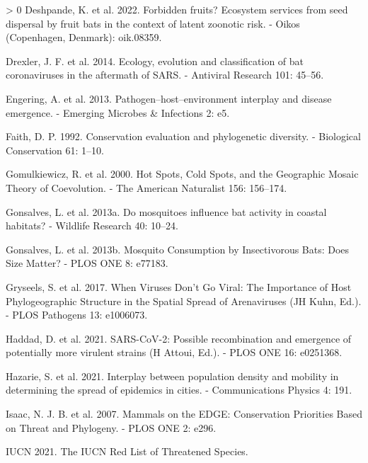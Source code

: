 \documentclass[11pt]{article}
\newlength{\cslhangindent}
\newenvironment{CSLReferences}[3] %
 {%
  \setlength{\parindent}{0pt}
  \ifodd #1 \everypar{\setlength{\hangindent}{\cslhangindent}}\ignorespaces\fi
  \ifnum #2 > 0
  \setlength{\parskip}{#2\baselineskip}
  \fi
 }%
 {}
\begin{document}
\begin{CSLReferences}{1}{0}
\leavevmode\hypertarget{ref-Deshpande2022ForFru}{}%
Deshpande, K. et al. 2022. Forbidden fruits? Ecosystem services from
seed dispersal by fruit bats in the context of latent zoonotic risk. -
Oikos (Copenhagen, Denmark): oik.08359.

\leavevmode\hypertarget{ref-Drexler2014EcoEvo}{}%
Drexler, J. F. et al. 2014. Ecology, evolution and classification of bat
coronaviruses in the aftermath of SARS. - Antiviral Research 101:
45--56.

\leavevmode\hypertarget{ref-Engering2013PatHos}{}%
Engering, A. et al. 2013. Pathogen--host--environment interplay and
disease emergence. - Emerging Microbes \& Infections 2: e5.

\leavevmode\hypertarget{ref-Faith1992ConEva}{}%
Faith, D. P. 1992. Conservation evaluation and phylogenetic diversity. -
Biological Conservation 61: 1--10.

\leavevmode\hypertarget{ref-Gomulkiewicz2000HotSpo}{}%
Gomulkiewicz, R. et al. 2000. Hot Spots, Cold Spots, and the Geographic
Mosaic Theory of Coevolution. - The American Naturalist 156: 156--174.

\leavevmode\hypertarget{ref-Gonsalves2013MosInf}{}%
Gonsalves, L. et al. 2013a. Do mosquitoes influence bat activity in
coastal habitats? - Wildlife Research 40: 10--24.

\leavevmode\hypertarget{ref-Gonsalves2013MosCon}{}%
Gonsalves, L. et al. 2013b. Mosquito Consumption by Insectivorous Bats:
Does Size Matter? - PLOS ONE 8: e77183.

\leavevmode\hypertarget{ref-Gryseels2017WheVir}{}%
Gryseels, S. et al. 2017. When Viruses Don't Go Viral: The Importance of
Host Phylogeographic Structure in the Spatial Spread of Arenaviruses (JH
Kuhn, Ed.). - PLOS Pathogens 13: e1006073.

\leavevmode\hypertarget{ref-Haddad2021SarPos}{}%
Haddad, D. et al. 2021. SARS-CoV-2: Possible recombination and emergence
of potentially more virulent strains (H Attoui, Ed.). - PLOS ONE 16:
e0251368.

\leavevmode\hypertarget{ref-Hazarie2021IntPop}{}%
Hazarie, S. et al. 2021. Interplay between population density and
mobility in determining the spread of epidemics in cities. -
Communications Physics 4: 191.

\leavevmode\hypertarget{ref-Isaac2007MamEdg}{}%
Isaac, N. J. B. et al. 2007. Mammals on the EDGE: Conservation
Priorities Based on Threat and Phylogeny. - PLOS ONE 2: e296.

\leavevmode\hypertarget{ref-IUCN2021IucRed}{}%
IUCN 2021. The IUCN Red List of Threatened Species.


\end{CSLReferences}
\end{document}
